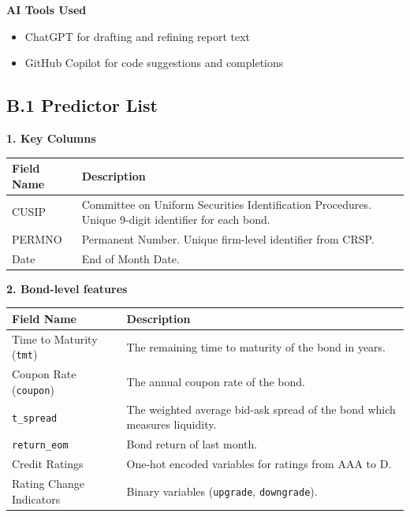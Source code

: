 \documentclass[12pt]{article}
\begin{document}
    \item \textbf{AI Tools Used}
    \begin{itemize}
        \item ChatGPT for drafting and refining report text
        \item GitHub Copilot for code suggestions and completions
    \end{itemize}

\subsection{B.1 Predictor List}

\textbf{1. Key Columns}

\begin{singlespace}
\begin{table}[H]
\centering
\begin{tabular}{lp{10cm}}
\toprule
\textbf{Field Name} & \textbf{Description} \\
\midrule
CUSIP & Committee on Uniform Securities Identification Procedures. Unique 9-digit identifier for each bond. \\
PERMNO & Permanent Number. Unique firm-level identifier from CRSP. \\
Date & End of Month Date. \\
\bottomrule
\end{tabular}
\end{table}
\end{singlespace}

\textbf{2. Bond-level features}

\begin{singlespace}
\begin{table}[H]
\centering
\begin{tabular}{l p{10cm}}
\toprule
\textbf{Field Name} & \textbf{Description} \\
\midrule
Time to Maturity (\texttt{tmt}) & The remaining time to maturity of the bond in years. \\
Coupon Rate (\texttt{coupon}) & The annual coupon rate of the bond. \\
\texttt{t\_spread} & The weighted average bid-ask spread of the bond which measures liquidity. \\
\texttt{return\_eom} & Bond return of last month. \\
Credit Ratings & One-hot encoded variables for ratings from AAA to D. \\
Rating Change Indicators & Binary variables (\texttt{upgrade}, \texttt{downgrade}). \\
\bottomrule
\end{tabular}
\end{table}
\end{singlespace}
\end{document}
